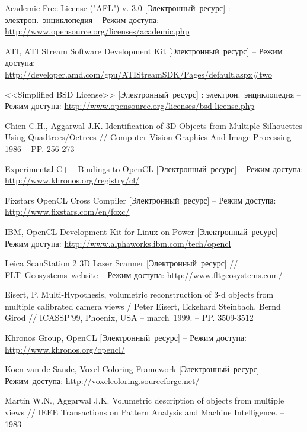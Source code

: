 \renewcommand{\refname}{Список литературы}
\begin{thebibliography}{99}

		Academic Free License ("AFL") v. 3.0 [Электронный~ресурс] : электрон.~энциклопедия -- Режим доступа:
		\url{http://www.opensource.org/licenses/academic.php}

		ATI, ATI Stream Software Development Kit [Электронный~ресурс]
		 -- Режим доступа:
		\url{http://developer.amd.com/gpu/ATIStreamSDK/Pages/default.aspx#two}
	
		<<Simplified BSD License>> [Электронный~ресурс] : электрон.~энциклопедия -- Режим доступа:
		\url{http://www.opensource.org/licenses/bsd-license.php}
	
		Chien C.H., Aggarwal J.K. Identification of 3D Objects from Multiple Silhouettes Using Quadtrees/Octrees // 
		Computer Vision Graphics And Image Processing -- 1986 -- PP. 256-273

		Experimental C++ Bindings to OpenCL [Электронный~ресурс] -- Режим доступа:
		\url{http://www.khronos.org/registry/cl/}
	
		Fixstars OpenCL Cross Compiler [Электронный~ресурс] -- Режим доступа:
		\url{http://www.fixstars.com/en/foxc/}
		
		IBM, OpenCL Development Kit for Linux on Power [Электронный~ресурс]
		-- Режим доступа:
		\url{http://www.alphaworks.ibm.com/tech/opencl}

		Leica ScanStation 2 3D Laser Scanner [Электронный~ресурс] //
		FLT~Geosystems~website -- Режим доступа:
		\url{http://www.fltgeosystems.com/}

		Eisert, P. Multi-Hypothesis, volumetric reconstruction of 3-d objects from multiple calibrated camera views /
		Peter Eisert, Eckehard Steinbach, Bernd Girod //
		ICASSP’99, Phoenix, USA -- march~1999. -- PP. 3509-3512

		Khronos Group, OpenCL [Электронный~ресурс] -- Режим доступа:
		\url{http://www.khronos.org/opencl/}

		Koen van de Sande, Voxel Coloring Framework [Электронный~ресурс]
		-- Режим~доступа:
		\url{http://voxelcoloring.sourceforge.net/}

		Martin W.N., Aggarwal J.K. Volumetric description of objects from multiple views //
		IEEE Transactions on Pattern Analysis and Machine Intelligence. -- 1983


\end{thebibliography}
